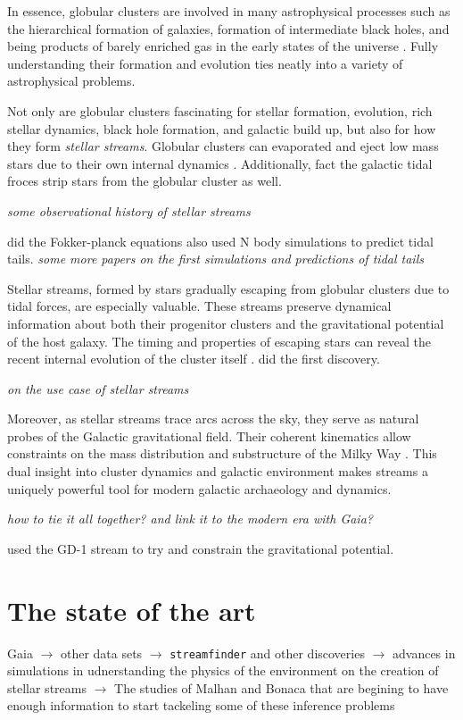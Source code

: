     In essence, globular clusters are involved in many astrophysical processes such as the hierarchical formation of galaxies, formation of intermediate black holes, and being products of barely enriched gas in the early states of the universe \citep{2016ApJ...823...52K,2025arXiv250116438K}. Fully understanding their formation and evolution ties neatly into a variety of astrophysical problems.

    Not only are globular clusters fascinating for stellar formation, evolution, rich stellar dynamics, black hole formation, and galactic build up, but also for how they form \textit{stellar streams}. Globular clusters can evaporated and eject low mass stars due to their own internal dynamics \citep{2003gmbp.book.....H}. Additionally, fact the galactic tidal froces strip stars from the globular cluster as well. \citep{2007ApJ...659.1212M}
    
    \textit{some observational history of stellar streams}

    \citep{1992ApJ...386..519O} did the Fokker-planck equations \citet{1999A&A...352..149C} also used N body simulations to predict tidal tails.  \textit{some more papers on the first simulations and predictions of tidal tails}

    Stellar streams, formed by stars gradually escaping from globular clusters due to tidal forces, are especially valuable. These streams preserve dynamical information about both their progenitor clusters and the gravitational potential of the host galaxy. The timing and properties of escaping stars can reveal the recent internal evolution of the cluster itself \citep{1972ApJ...178..623T}.  \citet{1995AJ....109.2553G} did the first discovery.

    \textit{on the use case of stellar streams }

    Moreover, as stellar streams trace arcs across the sky, they serve as natural probes of the Galactic gravitational field. Their coherent kinematics allow constraints on the mass distribution and substructure of the Milky Way \citep{2011MNRAS.417..198V}. This dual insight into cluster dynamics and galactic environment makes streams a uniquely powerful tool for modern galactic archaeology and dynamics.

    \textit{how to tie it all together? and link it to the modern era with Gaia?}

    \citet{2010ApJ...712..260K} used the GD-1 stream to try and constrain the gravitational potential.

\section{The state of the art}
    Gaia $\rightarrow$ other data sets $\rightarrow$ \texttt{streamfinder} and other discoveries $\rightarrow$ advances in simulations in udnerstanding the physics of the environment on the creation of stellar streams $\rightarrow$ The studies of Malhan and Bonaca that are begining to have enough information to start tackeling some of these inference problems 

